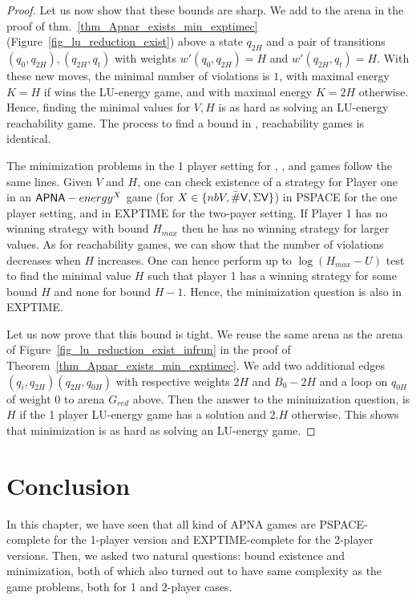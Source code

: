 \begin{proof}
Let us now show that these bounds are sharp. 
We add to the arena in the proof of thm.~\ref{thm_Apnar_exists_min_exptimec} (Figure~\ref{fig_lu_reduction_exist}) above a state $q_{2H}$ and a pair of transitions $(q_0,q_{2H}), (q_{2H},q_t)$ with weights $w'(q_0,q_{2H})= H$ and $w'(q_{2H},q_t)= H$. With these new moves, the minimal number of violations is $1$, with maximal energy $K=H$ if  wins the LU-energy game, and  with maximal energy $K=2H$ otherwise. Hence, finding the minimal values for $V,H$ is as hard as solving an LU-energy reachability game. The process to find a bound in \LVenergyconsnb, \LVenergysum reachability games is identical.

The minimization problems in the 1 player setting for \LVenergynb, \LVenergyconsnb, and \LVenergysum games follow the same lines. 
Given $V$ and $H$, one can check existence of a strategy for Player one in an $\textsf{APNA}-energy^X$ game (for $X\in \{nbV,\bar\#\textsf{V},\Sigma\textsf{V}\}$) in PSPACE for the one player setting, and in EXPTIME for the two-payer setting. 
If Player 1 has no winning strategy with bound $H_{max}$ then he has no winning strategy for larger values. 
As for reachability games, we can show that the number of violations decreases when $H$ increases. 
One can hence perform up to $\log(H_{max}-U)$ test to find the minimal value $H$ such that player 1 has a winning strategy for some bound $H$ and none for bound $H-1$. Hence, the minimization question is also in EXPTIME. 

Let us now prove that this bound is tight. We reuse the same arena as the arena of Figure~\ref{fig_lu_reduction_exist_infrun} in the proof of Theorem~\ref{thm_Apnar_exists_min_exptimec}. We add two additional edges $(q_i,q_{2H})(q_{2H},q_{0H})$ with respective weights $2H$ and $B_0-2H$ and a loop on $q_{0H}$ of weight $0$ to arena $G_{red}$ above. Then  the answer to the minimization question, is $H$ if the 1 player LU-energy game has a solution and $2.H$ otherwise. This shows that minimization is as hard as solving an LU-energy game.

\end{proof}

\section{Conclusion}
In this chapter, we have seen that all kind of APNA games are PSPACE-complete for the 1-player version and EXPTIME-complete for the 2-player versions. Then, we asked two natural questions: bound existence and minimization, both of which also turned out to have same complexity as the game problems, both for 1 and 2-player cases.




